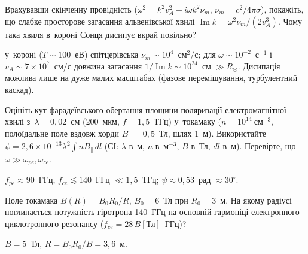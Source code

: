 \begin{problem}\label{prb:AlfvenDamping}
	Врахувавши скінченну провідність ($\omega^2=k^2v_A^2-i\omega k^2\nu_m$, $\nu_m=c^2/4\pi\sigma$),
	покажіть, що слабке просторове загасання альвенівської хвилі $\operatorname{Im}k=\omega^2\nu_m/(2v_A^3)$.
	Чому така хвиля в~короні Сонця дисипує вкрай повільно?
	\begin{solution}
		у~короні ($T\sim100$~еВ) спітцерівська $\nu_m\sim10^{4}$~см$^2$/с; для $\omega\sim10^{-2}$~с$^{-1}$
	і~$v_A\sim7\times10^{7}$~см/с довжина загасання $1/\operatorname{Im}k\sim10^{24}$~см$\;\gg R_\odot$. Дисипація
	можлива лише на дуже малих масштабах (фазове перемішування, турбулентний каскад).
	\end{solution}
\end{problem}

\begin{problem}\label{prb:FaradayRotation}
	Оцініть кут фарадеївського обертання площини поляризації електромагнітної хвилі з~$\lambda=0{,}02$~см
	(200~мкм, $f=1{,}5$~ТГц) у~токамаку ($n=10^{14}~\text{см}^{-3}$, полоїдальне поле вздовж хорди
	$B_\parallel=0{,}5$~Тл, шлях 1~м). Використайте
	$\psi=2{,}6\times10^{-13}\lambda^2\int nB_\parallel\,dl$ (СІ: $\lambda$ в~м, $n$ в~м$^{-3}$, $B$ в~Тл, $dl$ в~м).
	Перевірте, що $\omega\gg\omega_{pe},\omega_{ce}$.
	\begin{solution}
		$f_{pe}\approx90$~ГГц, $f_{ce}\lesssim140$~ГГц $\ll1{,}5$~ТГц; $\psi\approx0{,}53$~рад $\approx30^\circ$.
	\end{solution}
\end{problem}

\begin{problem}\label{prb:ECRHRadius}
	Поле токамака $B(R)=B_0R_0/R$, $B_0=6$~Тл при $R_0=3$~м. На якому радіусі поглинається
	потужність гіротрона 140~ГГц на основній гармоніці електронного циклотронного резонансу
	($f_{ce}=28\,B[\text{Тл}]$~ГГц)?
	\begin{solution}
		$B=5$~Тл, $R=B_0R_0/B=3{,}6$~м.
	\end{solution}
\end{problem}

